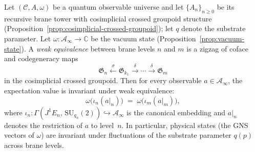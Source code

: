 \begin{proposition}
\label{prop:weak-equiv-invariance}
Let $(\mathcal{C}, A, \omega)$ be a quantum observable universe and let
$\{A_n\}_{n \geq 0}$ be its recursive brane tower with cosimplicial
crossed groupoid structure
(Proposition~\ref{prop:cosimplicial-crossed-groupoid}); let $q$ denote the substrate parameter.  Let
$\omega \colon \mathcal{A}_\infty \to \mathbb{C}$ be the vacuum state
(Proposition~\ref{prop:vacuum-state}).  A \emph{weak equivalence} between
brane levels $n$ and $m$ is a zigzag of coface and codegeneracy maps
\[
  \mathfrak{G}_n
  \xleftarrow{\;\sigma\;}
  \mathfrak{G}_{k_1}
  \xrightarrow{\;\delta\;}
  \cdots
  \xrightarrow{\;\delta\;}
  \mathfrak{G}_m
\]
in the cosimplicial crossed groupoid.  Then for every observable
$a \in \mathcal{A}_\infty$, the expectation value is invariant under
weak equivalence:
\[
  \omega\!\bigl(\iota_n(a|_n)\bigr)
  \;=\;
  \omega\!\bigl(\iota_m(a|_m)\bigr),
\]
where $\iota_n \colon \Gamma(J^1 E_n,\, \mathrm{SU}_{q_n}(2))
\hookrightarrow \mathcal{A}_\infty$ is the canonical embedding and
$a|_n$ denotes the restriction of $a$ to level~$n$.  In particular,
physical states (the GNS vectors of $\omega$) are invariant under
fluctuations of the substrate parameter $q(p)$ across brane levels.
\end{proposition}

